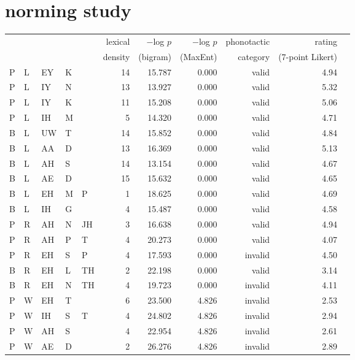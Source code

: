\section{\citet{Albright2012} norming study}

\begin{longtable}{l@{ } l@{ } l@{ } l@{ } l r r r r r r}
\toprule
   &   &   &   &    & lexical & $-$log $p$ & $-$log $p$ & phonotactic & rating \\
   &   &   &   &    & density & (bigram)   & (MaxEnt)   & category    & (7-point Likert) \\
\midrule
P & L & EY & K &    & 14 & 15.787 &  0.000  &  valid   & 4.94 \\
P & L & IY & N &    & 13 & 13.927 &  0.000  &  valid   & 5.32 \\
P & L & IY & K &    & 11 & 15.208 &  0.000  &  valid   & 5.06 \\
P & L & IH & M &    &  5 & 14.320 &  0.000  &  valid   & 4.71 \\
B & L & UW & T &    & 14 & 15.852 &  0.000  &  valid   & 4.84 \\
B & L & AA & D &    & 13 & 16.369 &  0.000  &  valid   & 5.13 \\
B & L & AH & S &    & 14 & 13.154 &  0.000  &  valid   & 4.67 \\
B & L & AE & D &    & 15 & 15.632 &  0.000  &  valid   & 4.65 \\
B & L & EH & M &  P &  1 & 18.625 &  0.000  &  valid   & 4.69 \\
B & L & IH & G &    &  4 & 15.487 &  0.000  &  valid   & 4.58 \\
P & R & AH & N & JH &  3 & 16.638 &  0.000  &  valid   & 4.94 \\
P & R & AH & P &  T &  4 & 20.273 &  0.000  &  valid   & 4.07 \\
P & R & EH & S &  P &  4 & 17.593 &  0.000  &  invalid & 4.50 \\
B & R & EH & L & TH &  2 & 22.198 &  0.000  &  valid   & 3.14 \\
B & R & EH & N & TH &  4 & 19.723 &  0.000  &  invalid & 4.11 \\
P & W & EH & T &    &  6 & 23.500 &  4.826  &  invalid & 2.53 \\
P & W & IH & S &  T &  4 & 24.802 &  4.826  &  invalid & 2.94 \\
P & W & AH & S &    &  4 & 22.954 &  4.826  &  invalid & 2.61 \\
P & W & AE & D &    &  2 & 26.276 &  4.826  &  invalid & 2.89 \\

\end{longtable}
